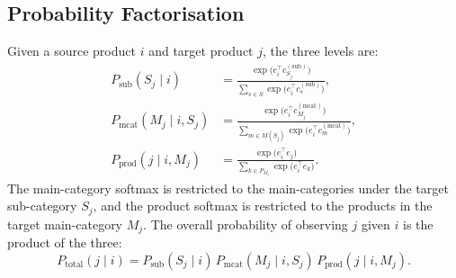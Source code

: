 \subsection{Probability Factorisation}
Given a source product $i$ and target product $j$, the three levels are:
\begin{align}
  P_{\text{sub}}(S_j \mid i)
    &= \frac{\exp\!\big(e_i^\top c^{(\text{sub})}_{S_j}\big)}
            {\sum_{s\in S}\exp\!\big(e_i^\top c^{(\text{sub})}_{s}\big)},
    \label{eq:emb-psub}\\[4pt]
  P_{\text{mcat}}(M_j \mid i, S_j)
    &= \frac{\exp\!\big(e_i^\top c^{(\text{mcat})}_{M_j}\big)}
            {\sum_{m\in M(S_j)}\exp\!\big(e_i^\top c^{(\text{mcat})}_{m}\big)},
    \label{eq:emb-pmcat}\\[4pt]
  P_{\text{prod}}(j \mid i, M_j)
    &= \frac{\exp\!\big(e_i^\top e_j\big)}
            {\sum_{k\in P_{M_j}}\exp\!\big(e_i^\top e_k\big)}.
    \label{eq:emb-pprod}
\end{align}
The main-category softmax is restricted to the main-categories under the target
sub-category $S_j$, and the product softmax is restricted to the products in
the target main-category $M_j$. The overall probability of observing $j$ given
$i$ is the product of the three:
\begin{equation}
  \label{eq:emb-ptotal}
  P_{\text{total}}(j\mid i)
    = P_{\text{sub}}(S_j\mid i)\,
      P_{\text{mcat}}(M_j\mid i,S_j)\,
      P_{\text{prod}}(j\mid i,M_j).
\end{equation}

